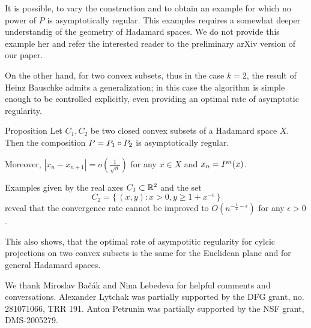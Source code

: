\documentclass[a4paper,10pt]{article}
\begin{document}
It is possible, to vary the construction  and to obtain an example for which no power of $P$ is asymptotically regular. This examples requires a somewhat deeper understandig of the geometry of Hadamard spaces.   We do not provide this example her and refer the interested reader to the preliminary arXiv version of our paper. 


 
 On the other hand, for two convex subsets, thus in the case $k=2$,  the result of Heinz Bauschke \cite{Bauschke} admits a generalization;  in this case the algorithm is simple enough to be controlled explicitly, even providing an optimal rate of asymptotic regularity.  

\begin{thm}{Proposition} \label{prop}
Let $C_1,C_2$ be two closed convex subsets of a Hadamard space $X$.
Then the composition $P\z=  P_1\circ P_2$ is asymptotically  regular.

Moreover, $|x_n-x_{n+1}| =o (\frac  {1} {\sqrt n})$ for any  $x\in X$ and $x_n \z= P^n (x)$.
\end{thm}

Examples given by the real axes $C_1 \subset \mathbb{R}^2$ and the set
\[C_2  = \{\,(x,y):x>0, y \geq 1+ x^{ -\epsilon}\,\}\]
reveal that the convergence rate cannot be improved to $O (n^{-\frac 1 2  -\epsilon})$ for any $\epsilon >0$. 

 This also shows, that the optimal rate of asympotitic regularity for cylcic projections on two convex subsets is the same for the Euclidean plane and for general Hadamard spaces. 



We thank Miroslav Bačák and Nina Lebedeva for helpful comments and conversations.
Alexander Lytchak was partially supported by the DFG grant, no. 281071066, TRR 191.
Anton Petrunin was partially supported by the NSF grant, DMS-2005279.
\end{document}
